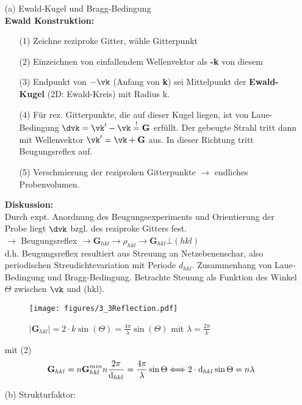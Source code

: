\begin{itemize}
    \item[(a)] Ewald-Kugel und Bragg-Bedingung\\
    \textbf{Ewald Konstruktion:}
    \begin{itemize}
        \item[(1)] Zeichne reziproke Gitter, wähle Gitterpunkt
        \item[(2)] Einzeichnen von einfallendem Wellenvektor als \textbf{-k} von diesem
        \item[(3)] Endpunkt von $-\vk$ (Anfang von \textbf{k}) sei Mittelpunkt der \textbf{Ewald-Kugel} (2D: Ewald-Kreis) mit Radius k.
        \item[(4)] Für rez. Gitterpunkte, die auf dieser Kugel liegen, ist von Laue-Bedingung $\dvk = \vk' - \vk \overset{!}{=} \textbf{G}$ erfüllt. Der gebeugte Strahl tritt dann mit Wellenvektor $\vk' = \vk + \textbf{G}$ aus. In dieser Richtung tritt Beugungsreflex auf.
        \item[(5)] Verschmierung der reziproken Gitterpunkte $\rightarrow$ endliches Probenvolumen.
    \end{itemize}
    \textbf{Diskussion:}\\
    Durch expt. Anordnung des Beugungsexperiments und Orientierung der Probe liegt $\dvk$ bzgl. des reziproke Gitters fest.\\
    $\rightarrow$ Beugungsreflex $\rightarrow \textbf{G}_{hkl} \rightarrow \rho_{hkl} \rightarrow \textbf{G}_{hkl} \bot (hkl)$\\
    d.h. Beugungsreflex resultiert aus Streuung an Netzebenenschar, also periodischen Streudichtevariation mit Periode $d_{hkl}$. Zusammenhang von Laue-Bedingung und Bragg-Bedingung. Betrachte Steuung als Funktion des Winkel $\Theta$ zwischen $\vk$ und (hkl).
    \begin{figure}[H]
        \centering
        \texttt{[image: figures/3\_3Reflection.pdf]}
        \caption{$|\textbf{G}_{hkl}|=2\cdot k \sin(\Theta) = \frac{4\pi}{\lambda}\sin(\Theta)$ mit $\lambda=\frac{2\pi}{k}$\\ }
        \label{fig:3_3Reflection}
    \end{figure}
    mit (2) 
    \begin{align*}
        \textbf{G}_{hkl} = n \textbf{G}_{hkl}^{min} n\frac{2\pi}{\textnormal{d}_{hkl}} = \frac{4\pi}{\lambda}\sin{\Theta} \Longleftrightarrow 2\cdot \textnormal{d}_{hkl}\sin{\Theta}= n \lambda
    \end{align*}
    \item[(b)] Strukturfaktor:\\

\end{itemize}
